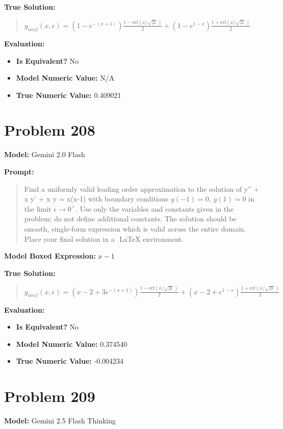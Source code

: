 \documentclass{article}
\begin{document}
{\textbf{True Solution:}
\begin{quote}
$y_{unif}(x, \epsilon) = \left(1 - e^{-(x+1)}\right) \frac{1-\text{erf}(x/\sqrt{2\epsilon})}{2} + \left(1 - e^{1-x}\right) \frac{1+\text{erf}(x/\sqrt{2\epsilon})}{2}$
\end{quote}

\textbf{Evaluation:}
\begin{itemize}
\item \textbf{Is Equivalent?} No
\item \textbf{Model Numeric Value:} N/A
\item \textbf{True Numeric Value:} 0.409021
\end{itemize}
\vspace{1cm}
\section*{Problem 208}
\textbf{Model:} Gemini 2.0 Flash

\textbf{Prompt:}
\begin{quote}
Find a uniformly valid leading order approximation to the solution of \epsilon y'' + x y' + x y = x(x-1) with boundary conditions $y(-1) = 0$, $y(1) = 0$ in the limit $\epsilon \to 0^+$. Use only the variables and constants given in the problem; do not define additional constants. The solution should be smooth, single-form expression which is valid across the entire domain. Place your final solution in a $\boxed{}$ LaTeX environment.
\end{quote}
\textbf{Model Boxed Expression:} $x-1$

\textbf{True Solution:}
\begin{quote}
$y_{unif}(x, \epsilon) = \left(x - 2 + 3e^{-(x+1)}\right) \frac{1-\text{erf}(x/\sqrt{2\epsilon})}{2} + \left(x - 2 + e^{1-x}\right) \frac{1+\text{erf}(x/\sqrt{2\epsilon})}{2}$
\end{quote}

\textbf{Evaluation:}
\begin{itemize}
\item \textbf{Is Equivalent?} No
\item \textbf{Model Numeric Value:} 0.374540
\item \textbf{True Numeric Value:} -0.004234
\end{itemize}
\vspace{1cm}
\section*{Problem 209}
\textbf{Model:} Gemini 2.5 Flash Thinking

}
\end{document}
